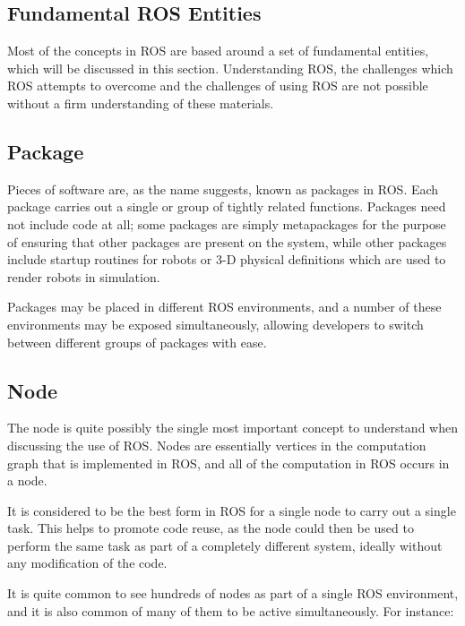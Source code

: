 \hypertarget{fundamental-ros-entities}{%
\subsection{Fundamental ROS Entities}\label{fundamental-ros-entities}}

Most of the concepts in ROS are based around a set of fundamental
entities, which will be discussed in this section. Understanding ROS,
the challenges which ROS attempts to overcome and the challenges of
using ROS are not possible without a firm understanding of these
materials.

\hypertarget{package}{%
\subsection{Package}\label{package}}

Pieces of software are, as the name suggests, known as packages in ROS.
Each package carries out a single or group of tightly related functions.
Packages need not include code at all; some packages are simply
metapackages for the purpose of ensuring that other packages are present
on the system, while other packages include startup routines for robots
or 3-D physical definitions which are used to render robots in
simulation.

Packages may be placed in different ROS environments, and a number of
these environments may be exposed simultaneously, allowing developers to
switch between different groups of packages with ease.

\hypertarget{node}{%
\subsection{Node}\label{node}}

The node is quite possibly the single most important concept to
understand when discussing the use of ROS. Nodes are essentially
vertices in the computation graph that is implemented in ROS, and all of
the computation in ROS occurs in a node.

It is considered to be the best form in ROS for a single node to carry
out a single task. This helps to promote code reuse, as the node could
then be used to perform the same task as part of a completely different
system, ideally without any modification of the code.

It is quite common to see hundreds of nodes as part of a single ROS
environment, and it is also common of many of them to be active
simultaneously. For instance:

